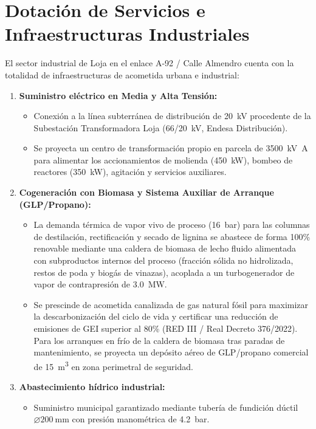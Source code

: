 \documentclass{report}
\begin{document}
\section{Dotación de Servicios e Infraestructuras Industriales}
El sector industrial de Loja en el enlace A-92 / Calle Almendro cuenta con la totalidad de infraestructuras de acometida urbana e industrial:
\begin{enumerate}
    \item \textbf{Suministro eléctrico en Media y Alta Tensión:}
          \begin{itemize}
              \item Conexión a la línea subterránea de distribución de \SI{20}{\kilo\volt} procedente de la Subestación Transformadora Loja (66/20~kV, Endesa Distribución).
              \item Se proyecta un centro de transformación propio en parcela de \SI{3500}{\kilo\volt\ampere} para alimentar los accionamientos de molienda (\SI{450}{\kilo\watt}), bombeo de reactores (\SI{350}{\kilo\watt}), agitación y servicios auxiliares.
          \end{itemize}
    \item \textbf{Cogeneración con Biomasa y Sistema Auxiliar de Arranque (GLP/Propano):}
          \begin{itemize}
              \item La demanda térmica de vapor vivo de proceso (\SI{16}{bar}) para las columnas de destilación, rectificación y secado de lignina se abastece de forma 100\% renovable mediante una caldera de biomasa de lecho fluido alimentada con subproductos internos del proceso (fracción sólida no hidrolizada, restos de poda y biogás de vinazas), acoplada a un turbogenerador de vapor de contrapresión de \SI{3.0}{\mega\watt}.
              \item Se prescinde de acometida canalizada de gas natural fósil para maximizar la descarbonización del ciclo de vida y certificar una reducción de emisiones de GEI superior al 80\% (RED III / Real Decreto 376/2022). Para los arranques en frío de la caldera de biomasa tras paradas de mantenimiento, se proyecta un depósito aéreo de GLP/propano comercial de \SI{15}{\cubic\metre} en zona perimetral de seguridad.
          \end{itemize}
    \item \textbf{Abastecimiento hídrico industrial:}
          \begin{itemize}
              \item Suministro municipal garantizado mediante tubería de fundición dúctil $\varnothing \SI{200}{\milli\metre}$ con presión manométrica de \SI{4.2}{bar}.

\end{itemize}
\end{enumerate}
\end{document}
